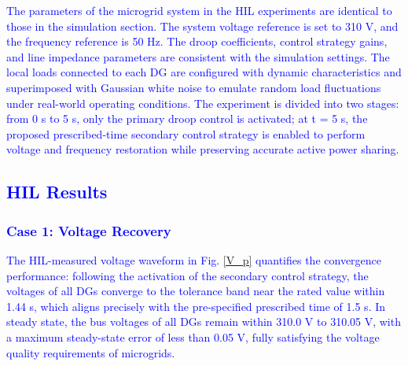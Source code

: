 \documentclass[]{interact}
\theoremstyle{plain}%
\theoremstyle{definition}
\theoremstyle{remark}
\begin{document}
\textcolor{blue}{The parameters of the microgrid system in the HIL experiments are identical to those in the simulation section. The system voltage reference is set to 310 V, and the frequency reference is 50 Hz. The droop coefficients, control strategy gains, and line impedance parameters are consistent with the simulation settings. The local loads connected to each DG are configured with dynamic characteristics and superimposed with Gaussian white noise to emulate random load fluctuations under real-world operating conditions. The experiment is divided into two stages: from 0 s to 5 s, only the primary droop control is activated; at t = 5 s, the proposed prescribed-time secondary control strategy is enabled to perform voltage and frequency restoration while preserving accurate active power sharing.}


\textcolor{blue}{\subsection{HIL Results}}

\textcolor{blue}{
\subsubsection*{Case 1: Voltage Recovery}
}

\textcolor{blue}{The HIL-measured voltage waveform in Fig. \ref{V_p} quantifies the convergence performance: following the activation of the secondary control strategy, the voltages of all DGs converge to the tolerance band near the rated value within 1.44 s, which aligns precisely with the pre-specified prescribed time of 1.5 s. In steady state, the bus voltages of all DGs remain within 310.0 V to 310.05 V, with a maximum steady-state error of less than 0.05 V, fully satisfying the voltage quality requirements of microgrids.}
\end{document}
